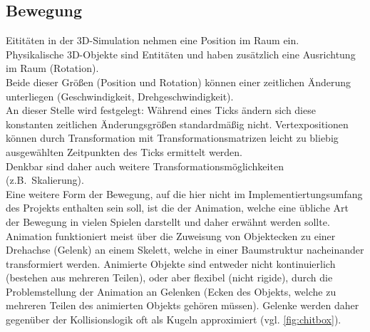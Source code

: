 \subsection{Bewegung}
Eititäten in der 3D-Simulation nehmen eine Position im Raum ein.\\
Physikalische 3D-Objekte sind Entitäten und haben zusätzlich eine Ausrichtung im Raum (Rotation).\\
Beide dieser Größen (Position und Rotation) können einer zeitlichen Änderung unterliegen (Geschwindigkeit, Drehgeschwindigkeit).\\
An dieser Stelle wird festgelegt: Während eines Ticks ändern sich diese konstanten zeitlichen Änderungsgrößen standardmäßig nicht. Vertexpositionen können durch Transformation mit Transformationsmatrizen leicht zu bliebig ausgewählten Zeitpunkten des Ticks ermittelt werden.\\
Denkbar sind daher auch weitere Transformationsmöglichkeiten (z.B.~Skalierung).\\
Eine weitere Form der Bewegung, auf die hier nicht im Implementiertungsumfang des Projekts enthalten sein soll, ist die der Animation, welche eine übliche Art der Bewegung in vielen Spielen darstellt und daher erwähnt werden sollte.\\
Animation funktioniert meist über die Zuweisung von Objektecken zu einer Drehachse (Gelenk) an einem Skelett, welche in einer Baumstruktur nacheinander transformiert werden. Animierte Objekte sind entweder nicht kontinuierlich (bestehen aus mehreren Teilen), oder aber flexibel (nicht rigide), durch die Problemstellung der Animation an Gelenken (Ecken des Objekts, welche zu mehreren Teilen des animierten Objekts gehören müssen). Gelenke werden daher gegenüber der Kollisionslogik oft als Kugeln approximiert (vgl. \ref{fig:chitbox}).


